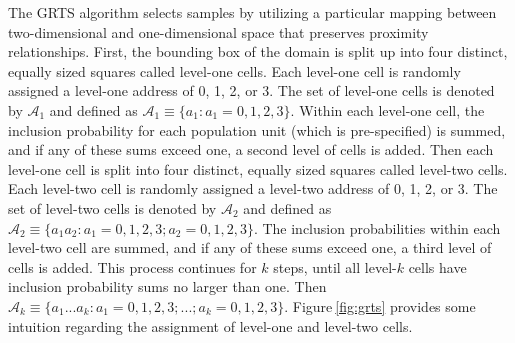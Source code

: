 \documentclass[]{elsarticle} %
\begin{document}
The GRTS algorithm selects samples by utilizing a particular mapping
between two-dimensional and one-dimensional space that preserves
proximity relationships. First, the bounding box of the domain is split
up into four distinct, equally sized squares called level-one cells.
Each level-one cell is randomly assigned a level-one address of 0, 1, 2,
or 3. The set of level-one cells is denoted by \(\mathcal{A}_1\) and
defined as \(\mathcal{A}_1 \equiv \{a_1: a_1 = 0, 1, 2, 3\}\). Within
each level-one cell, the inclusion probability for each population unit
(which is pre-specified) is summed, and if any of these sums exceed one,
a second level of cells is added. Then each level-one cell is split into
four distinct, equally sized squares called level-two cells. Each
level-two cell is randomly assigned a level-two address of 0, 1, 2, or
3. The set of level-two cells is denoted by \(\mathcal{A}_2\) and
defined as
\(\mathcal{A}_2 \equiv \{a_1a_2: a_1 = 0, 1, 2, 3; a_2 = 0, 1, 2, 3\}\).
The inclusion probabilities within each level-two cell are summed, and
if any of these sums exceed one, a third level of cells is added. This
process continues for \(k\) steps, until all level-\(k\) cells have
inclusion probability sums no larger than one. Then
\(\mathcal{A}_k \equiv \{a_1...a_k : a_1 = 0, 1, 2, 3; ...; a_k = 0, 1, 2, 3\}\).
Figure\(~\)\ref{fig:grts} provides some intuition regarding the
assignment of level-one and level-two cells.
\end{document}
